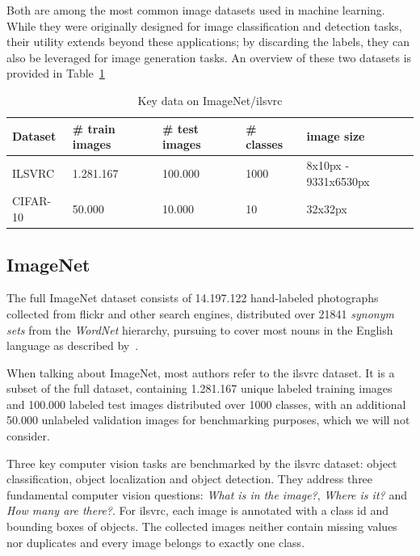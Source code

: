 Both are among the most common image datasets used in machine learning.
While they were originally designed for image classification and detection tasks, their utility extends beyond
these applications; by discarding the labels, they can also be leveraged for image generation tasks.
An overview of these two datasets is provided in Table~\ref{tab:datasets}

\begin{table}[ht]
    \begin{tabular}{lllll}
        Dataset  & \# train images & \# test images & \# classes & image size           \\ \hline \hline
        ILSVRC   & 1.281.167       & 100.000        & 1000       & 8x10px - 9331x6530px \\
        CIFAR-10 & 50.000          & 10.000         & 10         & 32x32px              \\ \hline \hline
    \end{tabular}
    \caption{Key data on ImageNet/\ac{ilsvrc}}
    \label{tab:datasets}
\end{table}

\subsection{ImageNet}\label{subsec:imagenet}
The full ImageNet dataset consists of 14.197.122 hand-labeled photographs collected from flickr and other search
engines, distributed over 21841 \textit{synonym sets} from the
\textit{WordNet} hierarchy, pursuing to cover most nouns in the English language as described by~\cite{wordnet}.

When talking about ImageNet, most authors refer to the \ac{ilsvrc} dataset.
It is a subset of the full dataset, containing 1.281.167 unique labeled training images and 100.000 labeled test
images distributed over 1000 classes, with an additional 50.000 unlabeled validation images for benchmarking
purposes, which we will not consider.

Three key computer vision tasks are benchmarked by the \ac{ilsvrc} dataset: object classification, object
localization and object detection.
They address three fundamental computer vision questions: \textit{What is in the image?}, \textit{Where is it?} and
\textit{How many are there?}.
For \ac{ilsvrc}, each image is annotated with a class id and bounding boxes of objects.
The collected images neither contain missing values nor duplicates and every image belongs to exactly one class.

